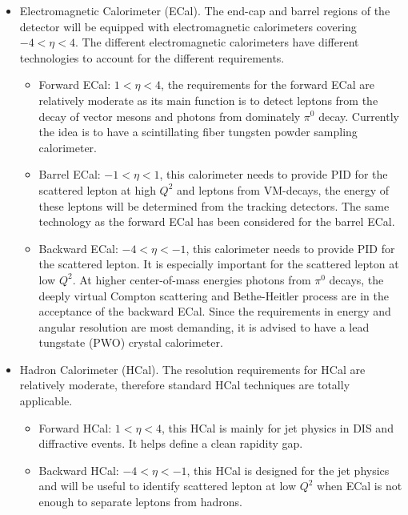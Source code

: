 \begin{itemize}
\item Electromagnetic Calorimeter (ECal). The end-cap and barrel regions of the
detector will be equipped with electromagnetic calorimeters covering
$-4<\eta<4$. The different electromagnetic calorimeters have different
technologies to account for the different requirements.


\begin{itemize}
\item Forward ECal: $1<\eta<4$, the requirements for the forward ECal are relatively
moderate as its main function is to detect leptons from the decay of vector mesons and
photons from dominately $\pi^{0}$ decay. Currently the idea is to have a scintillating fiber tungsten
powder sampling calorimeter. 
\item Barrel ECal: $-1<\eta<1$, this calorimeter needs to provide PID for the scattered lepton at high $Q^{2}$ and leptons from VM-decays, the energy of these leptons will be determined from the tracking detectors. 
The same technology as the forward ECal has been considered for the barrel ECal.
\item Backward ECal: $-4<\eta<-1$, this calorimeter needs to provide PID for the scattered
lepton. It is especially important for the scattered lepton at low $Q^{2}$. At
higher center-of-mass energies photons from $\pi^{0}$ decays, the deeply virtual Compton scattering and Bethe-Heitler
process are in the acceptance of the backward ECal. Since the requirements in
energy and angular resolution are most demanding, it is advised to have a lead tungstate (PWO)
crystal calorimeter.
\end{itemize}
\end{itemize}

\begin{itemize}
\item Hadron Calorimeter (HCal). The resolution requirements for HCal are relatively moderate, therefore standard HCal techniques are totally applicable.  

\begin{itemize}

\item Forward HCal: $1<\eta<4$, this HCal is mainly for jet physics in DIS and diffractive events. It helps define a clean rapidity gap.

\item Backward HCal: $-4<\eta<-1$, this HCal is designed for the jet physics and will be useful to identify scattered lepton at low $Q^{2}$
when ECal is not enough to separate leptons from hadrons. 

\end{itemize}
\end{itemize}

